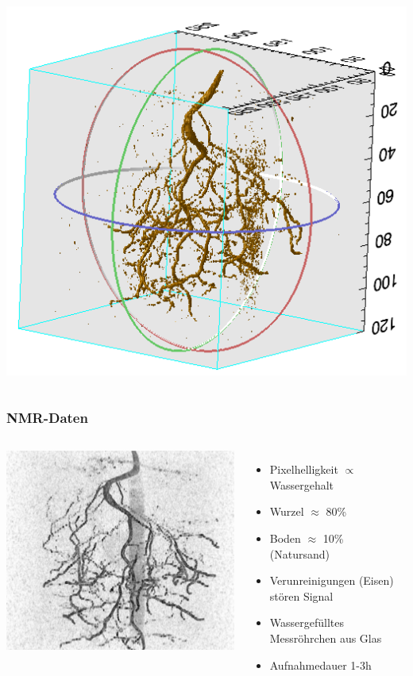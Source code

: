 \documentclass[final,ngerman,ignorenonframetext,compress]{beamer}
\begin{document}
\begin{frame}
\begin{columns}
\begin{center}
			\includegraphics[width=.7\linewidth]{img/d3}
		\end{center}
	\end{columns}
\end{frame}

\begin{frame}
	\frametitle{NMR-Daten}
	\begin{columns}
		\includegraphics[width=\linewidth]{img/raw-4.png}
		\begin{itemize}
			\item Pixelhelligkeit $\propto$ Wassergehalt
			\item Wurzel $\approx$ 80\%
			\item Boden $\approx$ 10\%  (Natursand)
			\item Verunreinigungen (Eisen) st\"oren Signal
			\item Wassergef\"ulltes Messr\"ohrchen aus Glas
			\item Aufnahmedauer 1-3h
		\end{itemize}
	\end{columns}
\end{frame}
\end{document}
